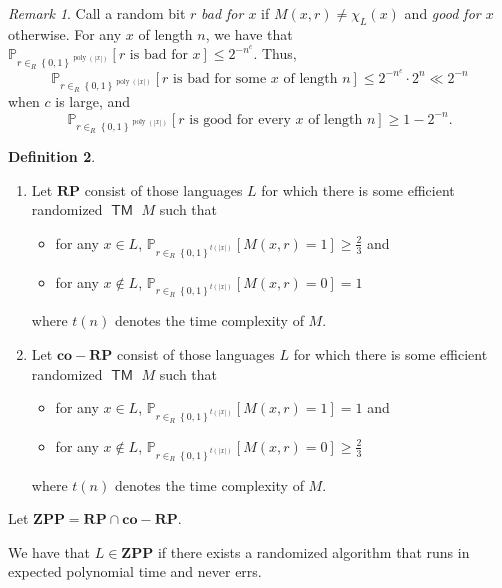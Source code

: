 \documentclass[10pt,letterpaper,cm]{nupset}
\theoremstyle{definition}
\newtheorem{definition}{Definition}[subsection]
\theoremstyle{theorem}
\theoremstyle{remark}
\newtheorem{remark}[definition]{Remark}
\newcommand{\1}{\mathbf{1}}
\newcommand{\0}{\vec 0}
\DeclareMathOperator{\TM}{\mathsf{TM}}
\DeclareMathOperator{\poly}{poly}
\begin{document}
\begin{remark}\label{good}
Call a random bit $r$ \textit{bad for $x$} if $M(x, r) \ne \chi_L(x)$ and \textit{good for $x$} otherwise. For any $x$ of length $n$, we have that  $\mathbb{P}_{r\in_R \left\{0,1\right\}^{\poly(\left\lvert{x}\right\rvert)}}\left[r \text{ is bad for }x\right] \leq 2^{{-}n^c}$. Thus, $$\mathbb{P}_{r\in_R \left\{0,1\right\}^{\poly(\left\lvert{x}\right\rvert)}}\left[r \text{ is bad for some }x \text{ of length }n\right] \leq 2^{{-}n^c}\cdot 2^n \ll 2^{{-}n}$$ when $c$ is large, and $$\mathbb{P}_{r\in_R \left\{0,1\right\}^{\poly(\left\lvert{x}\right\rvert)}}\left[r \text{ is good for every }x \text{ of length }n\right] \geq 1 - 2^{{-}n}.$$
\end{remark}

\begin{definition} $ $
\begin{enumerate}
\item Let $\mathbf{RP}$ consist of those languages $L$ for which there is some efficient randomized $\TM$ $M$ such that 
\begin{itemize}
\item for any $x\in L$, $\mathbb{P}_{r\in_R \left\{0,1\right\}^{t(\left\lvert{x}\right\rvert)}}\left[M(x,r)=1\right] \geq \frac{2}{3}$ and
\item for any $x\notin L$, $\mathbb{P}_{r\in_R \left\{0,1\right\}^{t(\left\lvert{x}\right\rvert)}}\left[M(x,r)=0\right] = 1$
\end{itemize} where $t(n)$ denotes the time complexity of $M$.
\item Let $\mathbf{co{-}RP}$ consist of those languages $L$ for which there is some efficient randomized $\TM$ $M$ such that 
\begin{itemize}
\item for any $x\in L$, $\mathbb{P}_{r\in_R \left\{0,1\right\}^{t(\left\lvert{x}\right\rvert)}}\left[M(x,r)=1\right]= 1$ and
\item for any $x\notin L$, $\mathbb{P}_{r\in_R \left\{0,1\right\}^{t(\left\lvert{x}\right\rvert)}}\left[M(x,r)=0\right] \geq \frac{2}{3}$
\end{itemize} where $t(n)$ denotes the time complexity of $M$.
\end{enumerate}
Let $\mathbf{ZPP} = \mathbf{RP} \cap \mathbf{co{-}RP}$.
\end{definition}

\smallskip


We have that $L \in \mathbf{ZPP}$ if there exists a randomized algorithm that runs in expected polynomial time and never errs. 
\end{document}
